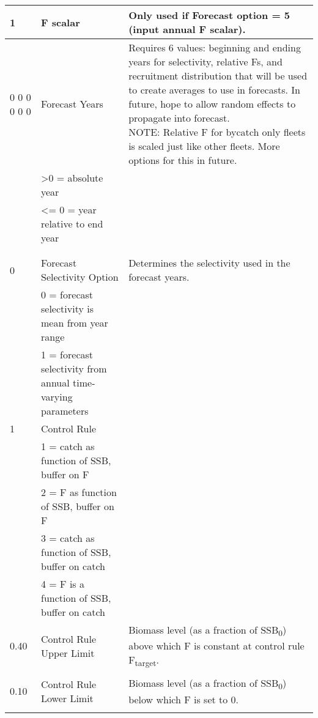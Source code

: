 \begin{landscape}
{\begin{longtable}{p{3.2cm} p{7cm} p{10.8cm}}
  \hline
  1 & F scalar & \multirow{1}{1cm}[-0.10cm]{\parbox{11cm}{Only used if Forecast option = 5 (input annual F scalar).}}\Tstrut\Bstrut\\
  
  \hline
  0 0 0 0 0 0 & Forecast Years &  \multirow{1}{1cm}[-0.25cm]{\parbox{11cm}{Requires 6 values:  beginning and ending years for selectivity, relative Fs, and recruitment distribution that will be used to create averages to use in forecasts.  In future, hope to allow random effects to propagate into forecast.  \\NOTE:  Relative F for bycatch only fleets is scaled just like other fleets.  More options for this in future.}}\Tstrut\\
    & >0 = absolute year & \\
    & <= 0 = year relative to end year & \\
    & & \\ 
    & & \Bstrut\\  

 \pagebreak   
 0 & Forecast Selectivity Option & Determines the selectivity used in the forecast years. \Tstrut\\
   & 0 = forecast selectivity is mean from year range & \\
   & 1 = forecast selectivity from annual time-varying parameters & \Bstrut\\

 \hline   
 1 & Control Rule & \Tstrut\\
   & 1 = catch as function of SSB, buffer on F & \\
   & 2 = F as function of SSB, buffer on F & \\
   & 3 = catch as function of SSB, buffer on catch & \\
   & 4 = F is a function of SSB, buffer on catch & \Bstrut\\
 \hline
 
 0.40 \Tstrut & Control Rule Upper Limit & \multirow{1}{1cm}[-0.25cm]{\parbox{11cm}{Biomass level (as a fraction of SSB\textsubscript{0}) above which F is constant at control rule F\textsubscript{target}.}} \\
   &  & \Bstrut\\
 
 \hline
 0.10 \Tstrut & Control Rule Lower Limit & \multirow{1}{1cm}[-0.25cm]{\parbox{11cm}{Biomass level (as a fraction of SSB\textsubscript{0}) below which F is set to 0.}} \\
   &  & \Bstrut\\
 

\end{longtable}}
\end{landscape}
